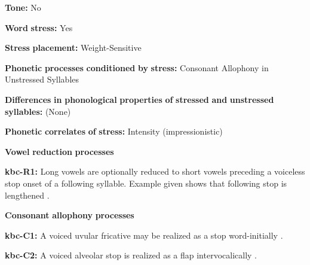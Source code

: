\documentclass[output=paper]{langsci/langscibook}
\begin{document}
\begin{styleBody}
\textbf{Tone:} No
\end{styleBody}

\begin{styleBody}
\textbf{Word} \textbf{stress:} Yes
\end{styleBody}

\begin{styleBody}
\textbf{Stress} \textbf{placement:} Weight-Sensitive
\end{styleBody}

\begin{styleBody}
\textbf{Phonetic} \textbf{processes} \textbf{conditioned} \textbf{by} \textbf{stress:} Consonant Allophony in Unstressed Syllables
\end{styleBody}

\begin{styleBody}
\textbf{Differences} \textbf{in} \textbf{phonological} \textbf{properties} \textbf{of} \textbf{stressed} \textbf{and} \textbf{unstressed} \textbf{syllables:} (None)
\end{styleBody}

\begin{styleBody}
\textbf{Phonetic} \textbf{correlates} \textbf{of} \textbf{stress:} Intensity (impressionistic)
\end{styleBody}

\begin{styleBody}
\textbf{Vowel} \textbf{reduction} \textbf{processes}
\end{styleBody}

\begin{styleBody}
\textbf{kbc-R1:} Long vowels are optionally reduced to short vowels preceding a voiceless stop onset of a following syllable. Example given shows that following stop is lengthened \citep[17]{Sandalo1997}.
\end{styleBody}

\begin{styleBody}
\textbf{Consonant} \textbf{allophony} \textbf{processes}
\end{styleBody}

\begin{styleBody}
\textbf{kbc-C1:} A voiced uvular fricative may be realized as a stop word-initially \citep[16]{Sandalo1997}.
\end{styleBody}

\begin{styleBody}
\textbf{kbc-C2:} A voiced alveolar stop is realized as a flap intervocalically \citep[16]{Sandalo1997}.
\end{styleBody}
\end{document}
